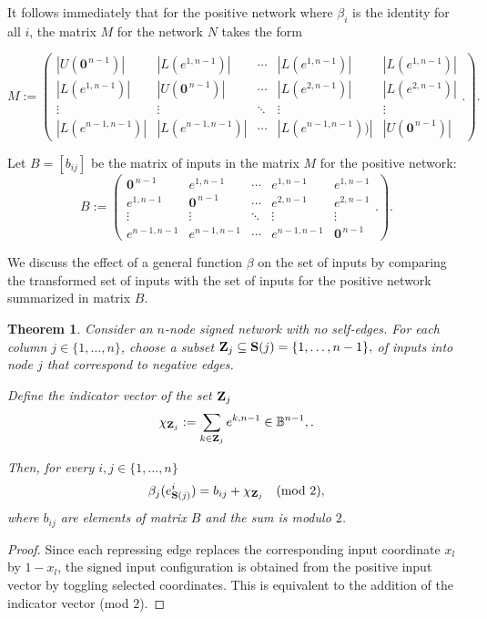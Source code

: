 \documentclass[12pt]{amsart}
\newcommand{\bZ}{{\bf Z}}
\newcommand{\Sources}{\mathbf{S}}
\newtheorem{thm}{Theorem}[section]
\theoremstyle{definition}
\begin{document}
It follows immediately that for the positive network where $\beta_i$ is the identity for all $i$, the matrix $M$ for the network $N$ takes the form 

\[
M:= \left (
\begin{array}{ccccc}
|U(\boldsymbol{0}^{\,n-1})| &
|L(e^{1,n-1})| &
\cdots &
 |L(e^{1,n-1})| &
 |L(e^{1,n-1})|
\\
|L(e^{1,n-1})|&
|U(\boldsymbol{0}^{\,n-1})| &
\cdots &
|L(e^{2,n-1})| &
|L(e^{2,n-1})|
\\
\vdots & \vdots & \ddots & \vdots & \vdots
\\
|L(e^{n-1,n-1})| &
|L(e^{n-1,n-1})|&
\cdots &
|L(e^{n-1,n-1}))|&
|U(\boldsymbol{0}^{\,n-1})|
\end{array}.
\right ).
\]

Let $B=[b_{ij}]$ be the matrix of inputs in the matrix $M$ for the positive network:
\[
B:= \left (
\begin{array}{ccccc}
\boldsymbol{0}^{\,n-1} &
e^{1,n-1}&
\cdots &
 e^{1,n-1} &
 e^{1,n-1}
\\
e^{1,n-1}&
\boldsymbol{0}^{\,n-1} &
\cdots &
e^{2,n-1} &
e^{2,n-1}
\\
\vdots & \vdots & \ddots & \vdots & \vdots
\\
e^{n-1,n-1} &
e^{n-1,n-1}&
\cdots &
e^{n-1,n-1}& \boldsymbol{0}^{\,n-1}
\end{array}.
\right ).
\]

We discuss the effect of a general function $\beta$ on the set of inputs by comparing the transformed set of inputs with the set of inputs for the positive network summarized in matrix $B$. 

\begin{thm}\label{thm:signed-flip-form}
Consider an $n$-node signed network with no self-edges.
For each column $j\in\{1,\dots,n\}$, choose a subset
\(\bZ_j \subseteq \Sources(j) = \{1,\dots,n-1\},\) of inputs into node $j$ that correspond to negative edges.

Define the indicator vector of the set $\bZ_j$ 
\[
\chi_{\bZ_j}
:=
\sum_{k \in \bZ_j} e^{k,n-1}
\in \mathbb B^{n-1},
.\]

Then, for every $i,j\in\{1,\dots,n\}$
\[
\beta_j(e^i_{\Sources(j)})
=
b_{ij}
+
\chi_{\bZ_j}
\quad (\mathrm{mod}\ 2),
\]
where $b_{ij}$ are elements of matrix $B$ and the sum is modulo $2$.
\end{thm}
\begin{proof}
Since each repressing edge replaces the corresponding input coordinate $x_l$ by $1-x_l$, the signed input configuration is obtained from the positive input vector by toggling selected coordinates. This is equivalent to the addition of the indicator vector (mod $2$).
\end{proof}
\end{document}
